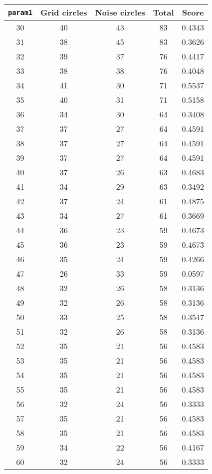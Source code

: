 \documentclass[letterpaper, 12pt]{article}
\begin{document}
\begin{longtable}{|c|c|c|c|c|}
\hline
\textbf{\texttt{param1}} & \textbf{Grid circles} & \textbf{Noise circles} & \textbf{Total} & \textbf{Score} \\
\hline
30 & 40 & 43 & 83 & 0.4343 \\
\hline
31 & 38 & 45 & 83 & 0.3626 \\
\hline
32 & 39 & 37 & 76 & 0.4417 \\
\hline
33 & 38 & 38 & 76 & 0.4048 \\
\hline
34 & 41 & 30 & 71 & 0.5537 \\
\hline
35 & 40 & 31 & 71 & 0.5158 \\
\hline
36 & 34 & 30 & 64 & 0.3408 \\
\hline
37 & 37 & 27 & 64 & 0.4591 \\
\hline
38 & 37 & 27 & 64 & 0.4591 \\
\hline
39 & 37 & 27 & 64 & 0.4591 \\
\hline
40 & 37 & 26 & 63 & 0.4683 \\
\hline
41 & 34 & 29 & 63 & 0.3492 \\
\hline
42 & 37 & 24 & 61 & 0.4875 \\
\hline
43 & 34 & 27 & 61 & 0.3669 \\
\hline
44 & 36 & 23 & 59 & 0.4673 \\
\hline
45 & 36 & 23 & 59 & 0.4673 \\
\hline
46 & 35 & 24 & 59 & 0.4266 \\
\hline
47 & 26 & 33 & 59 & 0.0597 \\
\hline
48 & 32 & 26 & 58 & 0.3136 \\
\hline
49 & 32 & 26 & 58 & 0.3136 \\
\hline
50 & 33 & 25 & 58 & 0.3547 \\
\hline
51 & 32 & 26 & 58 & 0.3136 \\
\hline
52 & 35 & 21 & 56 & 0.4583 \\
\hline
53 & 35 & 21 & 56 & 0.4583 \\
\hline
54 & 35 & 21 & 56 & 0.4583 \\
\hline
55 & 35 & 21 & 56 & 0.4583 \\
\hline
56 & 32 & 24 & 56 & 0.3333 \\
\hline
57 & 35 & 21 & 56 & 0.4583 \\
\hline
58 & 35 & 21 & 56 & 0.4583 \\
\hline
59 & 34 & 22 & 56 & 0.4167 \\
\hline
60 & 32 & 24 & 56 & 0.3333 \\

\end{longtable}
\end{document}
